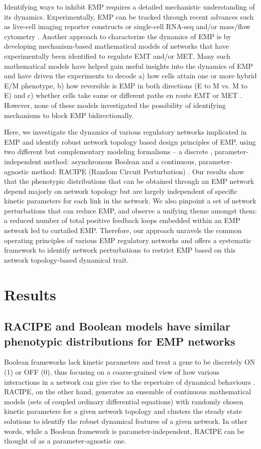 \documentclass[preprint,review,12pt]{elsarticle}
\begin{document}
	Identifying ways to inhibit EMP requires a detailed mechanistic understanding of its dynamics. Experimentally, EMP can be tracked through recent advances such as live-cell imaging reporter constructs or single-cell RNA-seq and/or mass/flow cytometry \cite{Jolly2019}. Another approach to characterize the dynamics of EMP is by developing mechanism-based mathematical models of networks that have experimentally been identified to regulate EMT and/or MET. Many such mathematical models have helped gain useful insights into the dynamics of EMP and have driven the experiments to decode a) how cells attain one or more hybrid E/M phenotype, b) how reversible is EMP in both directions (E to M vs. M to E) and c) whether cells take same or different paths en route EMT or MET \cite{Tripathi2019}. However, none of these models investigated the possibility of identifying mechanisms to block EMP bidirectionally.
	
	Here, we investigate the dynamics of various regulatory networks implicated in EMP and identify robust network topology based design principles of EMP, using two different but complementary modeling formalisms – a discrete , parameter-independent method: asynchronous Boolean \cite{Font-Clos2018} and a continuous, parameter-agnostic method: RACIPE (Random Circuit Perturbation) \cite{Huang2016}. Our results show that the phenotypic distributions that can be obtained through an EMP network depend majorly on network topology but are largely independent of specific kinetic parameters for each link in the network. We also pinpoint a set of network perturbations that can reduce EMP, and observe a unifying theme amongst them: a reduced number of total positive feedback loops embedded within an EMP network led to curtailed EMP. Therefore, our approach unravels the common operating principles of various EMP regulatory networks and offers a systematic framework to identify network perturbations to restrict EMP based on this network topology-based dynamical trait.
	
	\section{Results}
	
	\subsection{RACIPE and Boolean models have similar phenotypic distributions for EMP networks}
	Boolean frameworks lack kinetic parameters and treat a gene to be discretely ON (1) or OFF (0), thus focusing on a coarse-grained view of how various interactions in a network can give rise to the repertoire of dynamical behaviours \cite{Zanudo2019}. RACIPE, on the other hand, generates an ensemble of continuous mathematical models (sets of coupled ordinary differential equations) with randomly chosen kinetic parameters for a given network topology and clusters the steady state solutions to identify the robust dynamical features of a given network. In other words, while a Boolean framework is parameter-independent, RACIPE can be thought of as a parameter-agnostic one.
	
\end{document}
